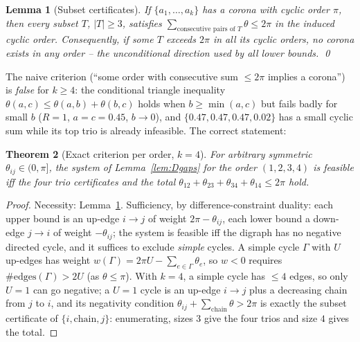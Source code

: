 \documentclass[11pt]{article}
\newtheorem{theorem}{Theorem}
\newtheorem{lemma}[theorem]{Lemma}
\theoremstyle{definition}
\begin{document}
\begin{lemma}[Subset certificates]\label{lem:Dsubset}
If $\{a_1,\dots,a_k\}$ has a corona with cyclic order $\pi$, then every
subset $T$, $|T|\ge3$, satisfies
$\sum_{\text{consecutive pairs of }T}\theta\le2\pi$ in the induced cyclic
order. Consequently, if some $T$ exceeds $2\pi$ in \emph{all} its cyclic
orders, no corona exists in any order -- the unconditional direction used
by all lower bounds. \qed
\end{lemma}

The naive criterion (``some order with consecutive sum $\le2\pi$ implies a
corona'') is \emph{false} for $k\ge4$: the conditional triangle inequality
$\theta(a,c)\le\theta(a,b)+\theta(b,c)$ holds when $b\ge\min(a,c)$ but
fails badly for small $b$ ($R=1$, $a=c=0.45$, $b\to0$), and
$\{0.47,0.47,0.47,0.02\}$ has a small cyclic sum while its top trio is
already infeasible. The correct statement:

\begin{theorem}[Exact criterion per order, $k=4$]\label{thm:Dk4}
For arbitrary symmetric $\theta_{ij}\in(0,\pi]$, the system of
Lemma~\ref{lem:Dgaps} for the order $(1,2,3,4)$ is feasible iff the four
trio certificates and the total
$\theta_{12}+\theta_{23}+\theta_{34}+\theta_{14}\le2\pi$ hold.
\end{theorem}
\begin{proof}
Necessity: Lemma~\ref{lem:Dsubset}. Sufficiency, by difference-constraint
duality: each upper bound is an up-edge $i\to j$ of weight
$2\pi-\theta_{ij}$, each lower bound a down-edge $j\to i$ of weight
$-\theta_{ij}$; the system is feasible iff the digraph has no negative
directed cycle, and it suffices to exclude \emph{simple} cycles. A simple
cycle $\Gamma$ with $U$ up-edges has weight
$w(\Gamma)=2\pi U-\sum_{e\in\Gamma}\theta_e$, so $w<0$ requires
$\#\mathrm{edges}(\Gamma)>2U$ (as $\theta\le\pi$). With $k=4$, a simple
cycle has $\le4$ edges, so only $U=1$ can go negative; a $U=1$ cycle is an
up-edge $i\to j$ plus a decreasing chain from $j$ to $i$, and its
negativity condition $\theta_{ij}+\sum_{\text{chain}}\theta>2\pi$ is
exactly the subset certificate of $\{i,\text{chain},j\}$: enumerating,
sizes $3$ give the four trios and size $4$ gives the total.
\end{proof}
\end{document}
